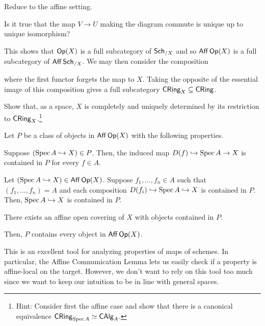 \documentclass[11pt]{article}
\begin{document}
\begin{exercise}
Reduce to the affine setting.
\end{exercise}

\begin{exercise}
Is it true that the map $V\to U$ making the diagram commute is unique up to unique isomorphism?
\end{exercise}

This shows that $\operatorname{\mathsf{Op}}(X)$ is a full subcategory of $\operatorname{\mathsf{Sch}}_{/X}$ and so $\operatorname{\mathsf{Aff}}\operatorname{\mathsf{Op}}(X)$ is a full subcategory of $\operatorname{\mathsf{Aff}}\operatorname{\mathsf{Sch}}_{/X}$. We may then consider the composition 
\begin{center}
\end{center}
where the first functor forgets the map to $X$. Taking the opposite of the essential image of this composition gives a full subcategory $\operatorname{\mathsf{CRing}}_X\subseteq\operatorname{\mathsf{CRing}}$. 

\begin{exercise}
Show that, as a space, $X$ is completely and uniquely determined by its restriction to $\operatorname{\mathsf{CRing}}_X$.\footnote{Hint: Consider first the affine case and show that there is a canonical equivalence $\operatorname{\mathsf{CRing}}_{\operatorname{Spec} A}\simeq\operatorname{\mathsf{CAlg}}_A$.}
\end{exercise}

\begin{theorem}
Let $P$ be a class of objects in $\operatorname{\mathsf{Aff}}\operatorname{\mathsf{Op}}(X)$ with the following properties.
\begin{enum}{\roman}
\item Suppose $(\operatorname{Spec} A\hookrightarrow X)\in P$. Then, the induced map $D(f)\hookrightarrow\operatorname{Spec} A\to X$ is contained in $P$ for every $f\in A$.

\item Let $(\operatorname{Spec} A\hookrightarrow X)\in\operatorname{\mathsf{Aff}}\operatorname{\mathsf{Op}}(X)$. Suppose $f_1,\ldots,f_n\in A$ such that $(f_1,\ldots,f_n)=A$ and each composition $D(f_i)\hookrightarrow\operatorname{Spec} A\hookrightarrow X$ is contained in $P$. Then, $\operatorname{Spec} A\hookrightarrow X$ is contained in $P$.

\item There exists an affine open covering of $X$ with objects contained in $P$.
\end{enum}
Then, $P$ contains every object in $\operatorname{\mathsf{Aff}}\operatorname{\mathsf{Op}}(X)$.
\end{theorem}

This is an excellent tool for analyzing properties of maps of schemes. In particular, the Affine Communication Lemma lets us easily check if a property is affine-local on the target. However, we don't want to rely on this tool too much since we want to keep our intuition to be in line with general spaces.
\end{document}
